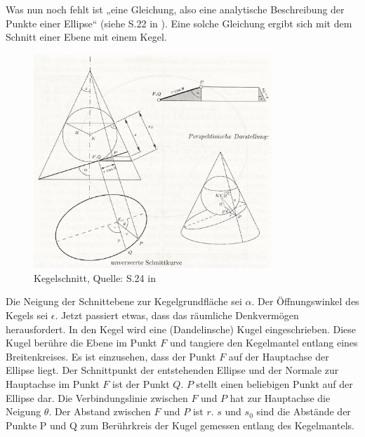Was nun noch fehlt ist „eine Gleichung, also eine analytische Beschreibung der Punkte einer Ellipse“ (siehe S.22 in \cite{Raumflugm}). Eine solche Gleichung ergibt sich mit dem Schnitt einer Ebene mit einem Kegel. 
\begin{figure}[h]                                                                           %
	\centering                                                                            	%
	\includegraphics[width=0.8\textwidth]{./images/keplers_law1.jpg}                        %
	\caption[Kegelschnitt]{Kegelschnitt, Quelle: S.24 in \cite{Raumflugm}}                  %
	\label{fig:kegelsch_1}                                                                  %
\end{figure}                                                                              	%
Die Neigung der Schnittebene zur Kegelgrundfläche sei \ensuremath{\alpha}. Der Öffnungswinkel des Kegels sei \ensuremath{\epsilon}. Jetzt passiert etwas, dass das räumliche Denkvermögen herausfordert. In den Kegel wird eine (Dandelinsche) Kugel eingeschrieben. Diese Kugel berühre die Ebene im Punkt \ensuremath{F} und tangiere den Kegelmantel entlang eines Breitenkreises. Es ist einzusehen, dass der Punkt \ensuremath{F} auf der Hauptachse der Ellipse liegt. Der Schnittpunkt der entstehenden Ellipse und der Normale zur Hauptachse im Punkt \ensuremath{F} ist der Punkt \ensuremath{Q}. \ensuremath{P} stellt einen beliebigen Punkt auf der Ellipse dar. Die Verbindungslinie zwischen \ensuremath{F} und \ensuremath{P} hat zur Hauptachse die Neigung \ensuremath{\theta}. Der Abstand zwischen \ensuremath{F} und \ensuremath{P} ist \ensuremath{r}. \ensuremath{s} und \ensuremath{s_0} sind die Abstände der Punkte P und Q zum Berührkreis der Kugel gemessen entlang des Kegelmantels. 
